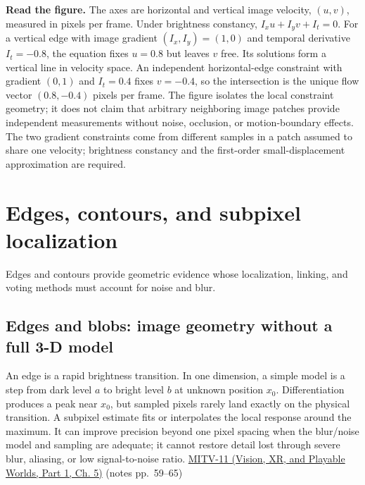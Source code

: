 \textbf{Read the figure.} The axes are horizontal and vertical image velocity, \((u,v)\), measured in pixels per frame. Under brightness constancy, \(I_xu+I_yv+I_t=0\). For a vertical edge with image gradient \((I_x,I_y)=(1,0)\) and temporal derivative \(I_t=-0.8\), the equation fixes \(u=0.8\) but leaves \(v\) free. Its solutions form a vertical line in velocity space. An independent horizontal-edge constraint with gradient \((0,1)\) and \(I_t=0.4\) fixes \(v=-0.4\), so the intersection is the unique flow vector \((0.8,-0.4)\) pixels per frame. The figure isolates the local constraint geometry; it does not claim that arbitrary neighboring image patches provide independent measurements without noise, occlusion, or motion-boundary effects. The two gradient constraints come from different samples in a patch assumed to share one velocity; brightness constancy and the first-order small-displacement approximation are required.

\section{Edges, contours, and subpixel localization}\label{04-visual-computing-ii-ch030-edges-contours-and-subpixel-localization}

\hypertarget{04-visual-computing-ii-ch030-edges-contours-and-subpixel-localization}{}

Edges and contours provide geometric evidence whose localization, linking, and voting methods must account for noise and blur.

\subsection{Edges and blobs: image geometry without a full 3-D model}\label{04-visual-computing-ii-ch030-edges-and-blobs-image-geometry-without-a-full-3-d-model}

\hypertarget{04-visual-computing-ii-ch030-edges-and-blobs-image-geometry-without-a-full-3-d-model}{}

An edge is a rapid brightness transition. In one dimension, a simple model is a step from dark level \(a\) to bright level \(b\) at unknown position \(x_0\). Differentiation produces a peak near \(x_0\), but sampled pixels rarely land exactly on the physical transition. A subpixel estimate fits or interpolates the local response around the maximum. It can improve precision beyond one pixel spacing when the blur/noise model and sampling are adequate; it cannot restore detail lost through severe blur, aliasing, or low signal-to-noise ratio. \href{../07-Vision-XR-and-Playable-Worlds-P01/main.pdf\#nameddest=04-visual-computing-ii-ch036-mitv-11---edge-detection-subpixel-position-cordic-line-detection-us-6408109}{MITV-11 (Vision, XR, and Playable Worlds, Part 1, Ch. 5)} (notes pp.~59--65)

